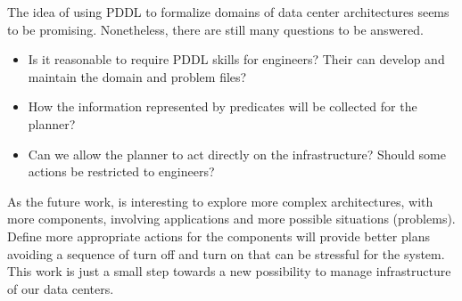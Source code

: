 \documentclass[letterpaper]{article}
\begin{document}

The idea of using PDDL to formalize domains of data center architectures seems to be promising. Nonetheless, there are still many questions to be answered.

\begin{itemize}
    \item Is it reasonable to require PDDL skills for engineers? Their can develop and maintain the domain and problem files? 
    \item How the information represented by predicates will be collected for the planner?
    \item Can we allow the planner to act directly on the infrastructure? Should some actions be restricted to engineers?
\end{itemize}

As the future work, is interesting to explore more complex architectures, with more components, involving applications and more possible situations (problems). Define more appropriate actions for the components will provide better plans avoiding a sequence of turn off and turn on that can be stressful for the system. This work is just a small step towards a new possibility to manage infrastructure of our data centers.



\end{document}
